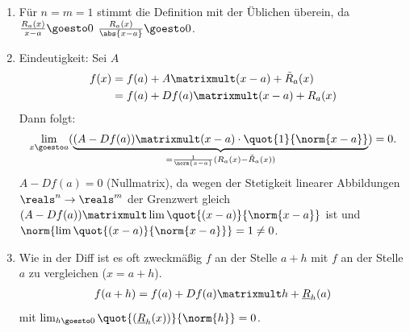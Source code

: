 \begin{bemerkungen*}
    \begin{enumerate}
        \item Für \( n=m=1 \) stimmt die Definition mit der Üblichen überein, da \( \frac{R_a(x)}{x-a}\goesto 0 \) \tiff \( \frac{R_a(x)}{\abs{x-a}}\goesto 0 \).
        \item Eindeutigkeit: Sei \( A \) \sd
        \begin{align*}
            f(x)\begin{aligned}[t]
                &=f(a)+A\matrixmult(x-a)+\tilde{R}_a(x)\\
                &=f(a)+Df(a)\matrixmult (x-a)+R_a(x)
            \end{aligned}            
        \end{align*}
        Dann folgt:
        \begin{align*}
            \lim_{x \goesto a}(\underbrace{(A-Df(a))\matrixmult (x-a)\cdot\quot{1}{\norm{x-a}}}_{=\frac{1}{\norm{x-a}}(R_a(x)-\tilde{R}_a(x))})=0.
        \end{align*}
        \timplies \( A-Df(a)=0 \) (Nullmatrix), da wegen der Stetigkeit linearer Abbildungen \( \reals^n\to \reals^m \) der Grenzwert gleich \( (A-Df(a))\matrixmult \lim \quot{(x-a)}{\norm{x-a}} \) ist und \( \norm{\lim \quot{(x-a)}{\norm{x-a}}}=1\neq 0 \).
        \item Wie in der Diff  ist es oft zweckmäßig \( f \) an der Stelle \( a+h \) mit \( f \) an der Stelle \( a \) zu vergleichen (\( x=a+h \)).
        \begin{align*}
            f(a+h)=f(a)+Df(a)\matrixmult h+\underline{R}_h(a)
        \end{align*}
        mit \( \lim_{h \goesto 0}\quot{(\underline{R}_h(x))}{\norm{h}}=0 \).
    \end{enumerate}
\end{bemerkungen*}
